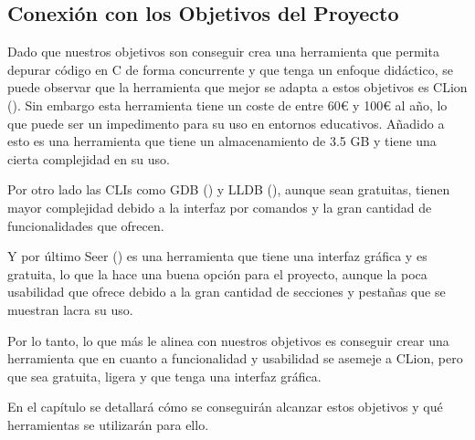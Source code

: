 
\subsection{Conexión con los Objetivos del Proyecto}{\label{subsec:conexión-objetivos-proyecto}}

Dado que nuestros objetivos son conseguir crea una herramienta que permita depurar código en C de forma concurrente y que tenga un enfoque didáctico, se puede observar que la herramienta que mejor se adapta a estos objetivos es CLion (). Sin embargo esta herramienta tiene un coste de entre 60€ y 100€ al año, lo que puede ser un impedimento para su uso en entornos educativos. Añadido a esto es una herramienta que tiene un almacenamiento de 3.5 GB y tiene una cierta complejidad en su uso. 

Por otro lado las \gls{CLI}s como \gls{GDB} () y \gls{LLDB} (), aunque sean gratuitas, tienen mayor complejidad debido a la interfaz por comandos y la gran cantidad de funcionalidades que ofrecen.

Y por último Seer () es una herramienta que tiene una interfaz gráfica y es gratuita, lo que la hace una buena opción para el proyecto, aunque la poca usabilidad que ofrece debido a la gran cantidad de secciones y pestañas que se muestran lacra su uso.

Por lo tanto, lo que más le alinea con nuestros objetivos es conseguir crear una herramienta que en cuanto a funcionalidad y usabilidad se asemeje a CLion, pero que sea gratuita, ligera y que tenga una interfaz gráfica.

En el capítulo  se detallará cómo se conseguirán alcanzar estos objetivos y qué herramientas se utilizarán para ello.


